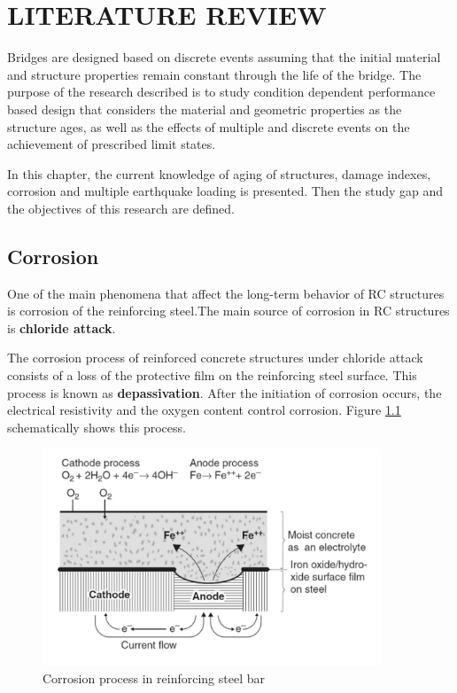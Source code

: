 \chapter{LITERATURE REVIEW}
\label{chap-two}
Bridges are designed based on discrete events assuming that the initial material and structure properties remain constant through the life of the bridge. The purpose of the research described is to study condition dependent performance based design that considers the material and geometric properties as the structure ages, as well as the effects of multiple and discrete events on the achievement of prescribed limit states.

In this chapter, the current knowledge of aging of structures, damage indexes, corrosion and multiple earthquake loading is presented. Then the study gap and the objectives of this research are defined.

\section{Corrosion}

One of the main phenomena that affect the long-term behavior of RC structures is corrosion of the reinforcing steel.The main source of corrosion in RC structures is \textbf{chloride attack}.

The corrosion process of reinforced concrete structures under chloride attack consists of a loss of the protective film on the reinforcing steel surface. This process is known as \textbf{depassivation}. After the initiation of corrosion occurs, the electrical resistivity and the oxygen content control corrosion. Figure \ref{fig:corr1} schematically shows this process.

\begin{figure}[htbp]
\centering
\includegraphics[width=0.9\textwidth]{Chapter-2/figs/Corrosion_Process}
\caption{Corrosion process in reinforcing steel bar \cite{Mehta2014}}
\label{fig:corr1}
\end{figure}

